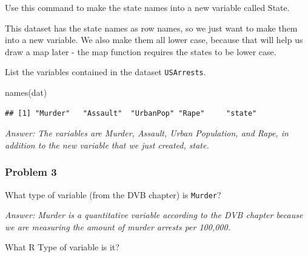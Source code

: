 \documentclass[
]{article}
\newenvironment{Shaded}{\begin{snugshade}}{\end{snugshade}}
\newcommand{\FunctionTok}[1]{\textcolor[rgb]{0.00,0.00,0.00}{#1}}
\newcommand{\NormalTok}[1]{#1}
\newcommand{\OtherTok}[1]{\textcolor[rgb]{0.56,0.35,0.01}{#1}}
\newcommand{\SpecialCharTok}[1]{\textcolor[rgb]{0.00,0.00,0.00}{#1}}
\begin{document}
Use this command to make the state names into a new variable called
State.

\begin{Shaded}
\end{Shaded}

This dataset has the state names as row names, so we just want to make
them into a new variable. We also make them all lower case, because that
will help us draw a map later - the map function requires the states to
be lower case.

List the variables contained in the dataset \texttt{USArrests}.

\begin{Shaded}
\begin{Highlighting}[]
\FunctionTok{names}\NormalTok{(dat)}
\end{Highlighting}
\end{Shaded}

\begin{verbatim}
## [1] "Murder"   "Assault"  "UrbanPop" "Rape"     "state"
\end{verbatim}

\emph{Answer: The variables are Murder, Assault, Urban Population, and
Rape, in addition to the new variable that we just created, state.}

\hypertarget{problem-3}{%
\subsubsection{Problem 3}\label{problem-3}}

What type of variable (from the DVB chapter) is \texttt{Murder}?

\emph{Answer: Murder is a quantitative variable according to the DVB
chapter because we are measuring the amount of murder arrests per
100,000.}

What R Type of variable is it?

\begin{Shaded}
\end{Shaded}
\end{document}

